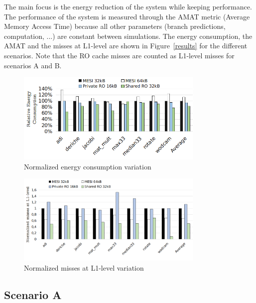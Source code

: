 \documentclass[sigconf]{acmart}
\begin{document}
The main focus is the energy reduction of the system while keeping performance. The performance of the system is measured through the AMAT metric (Average Memory Access Time) because all other parameters (branch predictions, computation, ...) are constant between simulations. The energy consumption, the AMAT and the misses at L1-level are shown in Figure~\ref{results} for the different scenarios. Note that the RO cache misses are counted as L1-level misses for scenarios A and B.


\begin{figure}
    \centering
    \includegraphics[width=9cm]{./images/results1.png}
    \caption{Normalized energy consumption variation}
    \label{resultsConso}
\end{figure}

\begin{figure}
    \centering
    \includegraphics[width=9cm]{./images/resultsMisses.png}
    \caption{Normalized misses at L1-level variation}
    \label{resultsMisses}
\end{figure}


\subsection{Scenario A}
\end{document}
